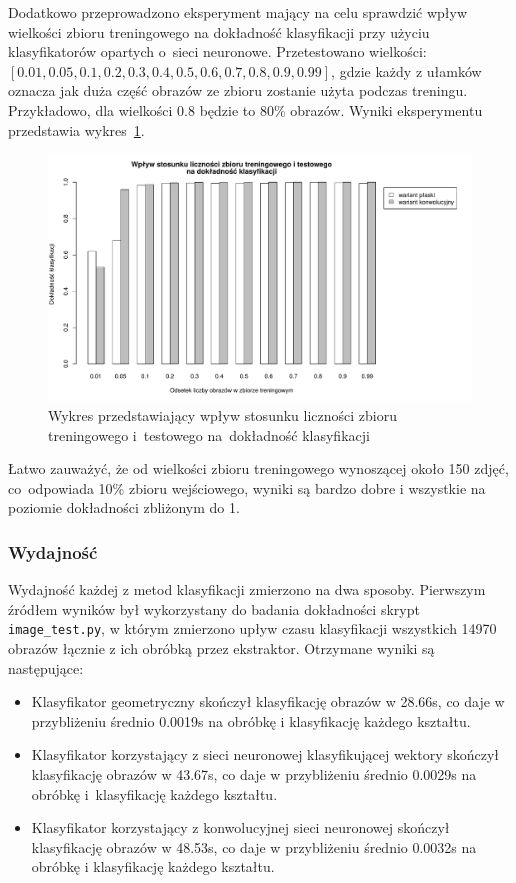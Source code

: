 \documentclass[11pt,a4paper]{article}
\begin{document}
Dodatkowo przeprowadzono eksperyment mający na celu sprawdzić wpływ wielkości zbioru treningowego na dokładność klasyfikacji przy użyciu klasyfikatorów opartych o~sieci neuronowe. Przetestowano wielkości: $[0.01, 0.05, 0.1, 0.2, 0.3, 0.4, 0.5, 0.6, 0.7, 0.8, 0.9, 0.99]$, gdzie każdy z ułamków oznacza jak duża część obrazów ze zbioru \cite{shapes} zostanie użyta podczas treningu. Przykładowo, dla wielkości 0.8 będzie to 80\% obrazów.
Wyniki eksperymentu przedstawia wykres~\ref{fig:test-train-proportions}.

\begin{figure}[H]
    \centering
    \includegraphics[width=\textwidth]{res/img/test-train-proportions.pdf}
    \caption{Wykres przedstawiający wpływ stosunku liczności zbioru treningowego i~testowego na~dokładność klasyfikacji}
    \label{fig:test-train-proportions}
\end{figure}

Łatwo zauważyć, że od wielkości zbioru treningowego wynoszącej około 150 zdjęć, co~odpowiada 10\% zbioru wejściowego, wyniki są bardzo dobre i wszystkie na poziomie dokładności zbliżonym do 1.

\subsubsection{Wydajność}

Wydajność każdej z metod klasyfikacji zmierzono na dwa sposoby. Pierwszym źródłem wyników był wykorzystany do badania dokładności skrypt \verb+image_test.py+, w którym zmierzono upływ czasu klasyfikacji wszystkich 14970 obrazów łącznie z ich obróbką przez ekstraktor. Otrzymane wyniki są następujące:
\begin{itemize}
    \item Klasyfikator geometryczny skończył klasyfikację obrazów w 28.66s, co daje w przybliżeniu średnio 0.0019s na obróbkę i klasyfikację każdego kształtu.
    \item Klasyfikator korzystający z sieci neuronowej klasyfikującej wektory skończył klasyfikację obrazów w 43.67s, co daje w przybliżeniu średnio 0.0029s na obróbkę i~klasyfikację każdego kształtu.
    \item Klasyfikator korzystający z konwolucyjnej sieci neuronowej skończył klasyfikację obrazów w 48.53s, co daje w przybliżeniu średnio 0.0032s na obróbkę i klasyfikację każdego kształtu.
\end{itemize}
\end{document}
